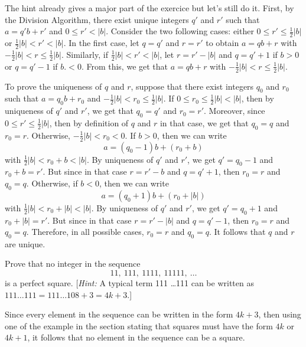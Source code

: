 \begin{solution}
    The hint already gives a major part of the exercice but let's still do it. First, by the Division Algorithm, there exist unique integers $q'$ and $r'$ such that $a = q'b + r'$ and $0 \leq r' < |b|$. Consider the two following cases: either $0 \leq r' \leq \frac{1}{2}|b|$ or $\frac{1}{2}|b| < r' < |b|$. In the first case, let $q = q'$ and $r = r'$ to obtain $a = qb + r$ with $-\frac{1}{2}|b| < r \leq \frac{1}{2}|b|$. Similarly, if $\frac{1}{2}|b| < r' < |b|$, let $r = r' - |b|$ and $q = q' + 1$ if $b > 0$ or $q = q' - 1$ if $b. < 0$. From this, we get that $a = qb + r$ with $-\frac{1}{2}|b| < r \leq \frac{1}{2}|b|$. 

    To prove the uniqueness of $q$ and $r$, suppose that there exist integers $q_0$ and $r_0$ such that $a = q_0 b + r_0$ and $-\frac{1}{2}|b| < r_0 \leq \frac{1}{2}|b|$. If $0 \leq r_0 \leq \frac{1}{2}|b| < |b|$, then by uniqueness of $q'$ and $r'$, we get that $q_0 = q'$ and $r_0 = r'$. Moreover, since $0 \leq r' \leq \frac{1}{2}|b|$, then by definition of $q$ and $r$ in that case, we get that $q_0 = q$ and $r_0 = r$. Otherwise, $ - \frac{1}{2}|b| < r_0 < 0$. If $b > 0$, then we can write
    $$a = (q_0 - 1)b + (r_0 + b)$$
    with $\frac{1}{2}|b| < r_0 + b < |b|$. By uniqueness of $q'$ and $r'$, we get $q' = q_0 - 1$ and $r_0 + b = r'$. But since in that case $r = r' - b$ and $q = q' + 1$, then $r_0 = r$ and $q_0 = q$. Otherwise, if $b < 0$, then we can write 
    $$a = (q_0 + 1)b + (r_0 + |b|)$$
    with $\frac{1}{2}|b| < r_0 + |b| < |b|$. By uniqueness of $q'$ and $r'$, we get $q' = q_0 + 1$ and $r_0 + |b| = r'$. But since in that case $r = r' - |b|$ and $q = q' - 1$, then $r_0 = r$ and $q_0 = q$. Therefore, in all possible cases, $r_0 = r$ and $q_0 = q$. It follows that $q$ and $r$ are unique.\\
\end{solution}

\begin{exercise}
    Prove that no integer in the sequence
    $$11, \ 111, \ 1111, \ 11111, \ \dots$$
    is a perfect square. [\textit{Hint:} A typical term 111 \dots 111 can be written as $111\dots111 = 111\dots 108 + 3 = 4k+3$.]\\
\end{exercise}

\begin{solution}
    Since every element in the sequence can be written in the form $4k+3$, then using one of the example in the section stating that squares must have the form $4k$ or $4k+1$, it follows that no element in the sequence can be a square. \\
\end{solution}

